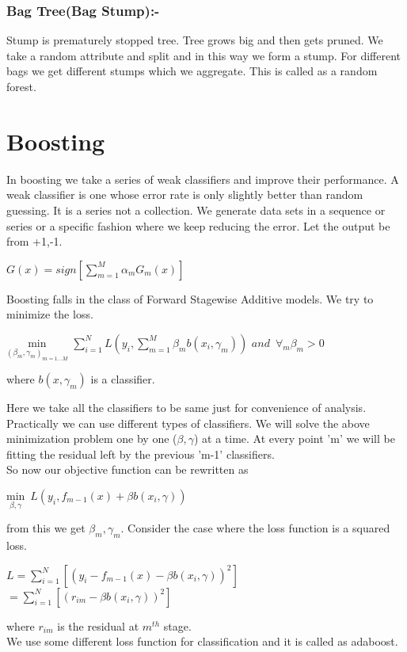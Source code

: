\documentclass[twoside]{article}
\begin{document}
\subsubsection*{Bag Tree(Bag Stump):-}
Stump is prematurely stopped tree. Tree grows big and then gets pruned. We take a random attribute and split and in this way we form a stump. For different bags we get different stumps which we aggregate. This is called as a random forest.


\section{Boosting}

In boosting we take a series of weak classifiers and improve their performance. A weak classifier is one whose error rate is only slightly better than random guessing. It is a series not a collection. We generate data sets in a sequence or series or a specific fashion where we keep reducing the error.
Let the output be from {+1,-1}.
\begin{center}
$G(x) = sign[\sum\limits_{m=1}^M \alpha_{m}G_{m}(x)]$
\end{center}


Boosting falls in the class of Forward Stagewise Additive models. We try to minimize the loss.
\begin{center}
$\underset{{(\beta_{m},\gamma_{m})}_{m=1...M}}{\text{min}}  \,\,\sum\limits_{i=1}^N L(y_{i}, \sum\limits_{m=1}^M \beta_{m}b(x_{i}, \gamma_{m}))$         
           $and \,\,\,\forall_{m} \beta_{m}>0 $

\end{center}


where
$b(x, \gamma_{m})$ is a classifier.


Here we take all the classifiers to be same just for convenience of analysis. Practically we can use different types of classifiers. We will solve the above minimization problem one by one ($\beta, \gamma$) at a time. At every point 'm' we will be fitting the residual left by the previous 'm-1' classifiers.\\
So now our objective function can be rewritten as 
\begin{center}
$\underset{\beta,\gamma}{\text{min}}  \,\,\, L(y_{i}, f_{m-1}(x) + \beta b(x_{i}, \gamma))$
\end{center}
from this we get $\beta_{m}, \gamma_{m}$. Consider the case where the loss function is a squared loss.
\begin{center}
$ L = \sum\limits_{i=1}^N [(y_{i} - f_{m-1}(x) - \beta b(x_{i}, \gamma))^2]$\\
$ = \sum\limits_{i = 1}^N [(r_{im} - \beta b(x_{i}, \gamma))^2]$
\end{center}
where $r_{im}$ is the residual at $m^{th}$ stage.\\
We use some different loss function for classification and it is called as adaboost.
\end{document}
